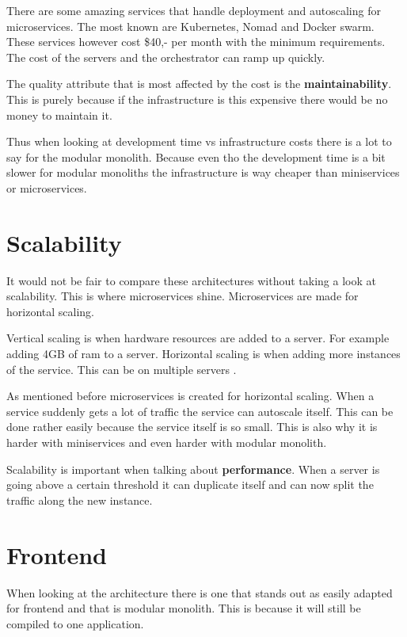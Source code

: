 There are some amazing services that handle deployment and autoscaling for microservices. The most known are Kubernetes, Nomad and Docker swarm. These services however cost \$40,- per month with the minimum requirements. The cost of the servers and the orchestrator can ramp up quickly.

The quality attribute that is most affected by the cost is the \textbf{maintainability}. This is purely because if the infrastructure is this expensive there would be no money to maintain it.

Thus when looking at development time vs infrastructure costs there is a lot to say for the modular monolith. Because even tho the development time is a bit slower for modular monoliths the infrastructure is way cheaper than miniservices or microservices.

\section{Scalability}
\label{sec:Scalability}

It would not be fair to compare these architectures without taking a look at scalability. This is where microservices shine. Microservices are made for horizontal scaling.

Vertical scaling is when hardware resources are added to a server. For example adding 4GB of ram to a server. Horizontal scaling is when adding more instances of the service. This can be on multiple servers \cite{microservicesMultipleServer}.

As mentioned before microservices is created for horizontal scaling. When a service suddenly gets a lot of traffic the service can autoscale itself. This can be done rather easily because the service itself is so small. This is also why it is harder with miniservices and even harder with modular monolith.

Scalability is important when talking about \textbf{performance}. When a server is going above a certain threshold it can duplicate itself and can now split the traffic along the new instance.

\section{Frontend}
\label{sec:FrontendComparison}

When looking at the architecture there is one that stands out as easily adapted for frontend and that is modular monolith. This is because it will still be compiled to one application.

